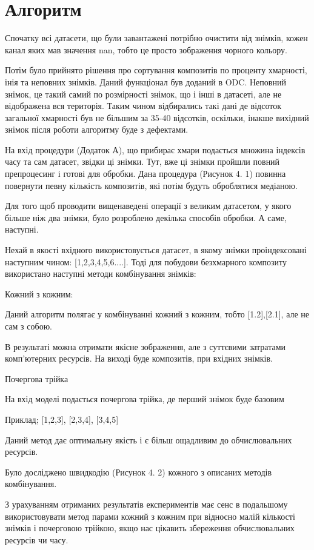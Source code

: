 \section{Алгоритм}
Спочатку всі датасети, що були завантажені потрібно очистити від знімків, кожен канал яких мав значення nan, тобто це просто зображення чорного кольору.

Потім було прийнято рішення про сортування композитів по проценту хмарності, інія та неповних знімків. Даний функціонал був доданий в ODC. Неповний знімок, це такий самий по розмірності знімок, що і інші в датасеті, але не відображена вся територія. Таким чином відбирались такі дані де відсоток загальної хмарності був не більшим за 35-40 відсотків, оскільки, інакше вихідний знімок після роботи алгоритму буде з дефектами.

На вхід процедури (Додаток А), що прибирає хмари подається множина індексів часу та сам датасет, звідки ці знімки. Тут, вже ці знімки пройшли повний препроцесинг і готові для обробки. Дана процедура (Рисунок 4. 1) повинна повернути певну кількість композитів, які потім будуть оброблятися медіаною.

Для того щоб проводити вищенаведені операції з великим датасетом, у якого більше ніж два знімки, було розроблено декілька способів обробки. А саме, наступні.

Нехай в якості вхідного використовується датасет, в якому знімки проіндексовані наступним чином: [1,2,3,4,5,6....]. Тоді для побудови безхмарного композиту використано наступні методи комбінування знімків:

Кожний з кожним:

Даний алгоритм полягає у комбінуванні кожний з кожним, тобто [1.2],[2.1], але не сам з собою.

В результаті можна отримати якісне зображення, але з суттєвими затратами комп’ютерних ресурсів. На виході буде композитів, при вхідних знімків.

Почергова трійка

На вхід моделі подається почергова трійка, де перший знімок буде базовим

Приклад; [1,2,3], [2,3,4], [3,4,5]

Даний метод дає оптимальну якість і є більш ощадливим до обчислювальних ресурсів.

Було досліджено швидкодію (Рисунок 4. 2) кожного з описаних методів комбінування.

З урахуванням отриманих результатів експериментів має сенс в подальшому використовувати метод парами кожний з кожним при відносно малій кількості знімків і почерговою трійкою, якщо нас цікавить збереження обчислювальних ресурсів чи часу.

